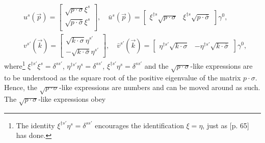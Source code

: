\begin{equation}
	\begin{split}
		&u^s(\vec{p})=\begin{bmatrix}
			\sqrt{p\cdot \sigma}\xi^s\\
			\sqrt{p\cdot \bar{\sigma}}\xi^s\\
		\end{bmatrix}, \quad \bar{u}^s(\vec{p})=\begin{bmatrix}
			\xi^{\dagger s}\sqrt{p\cdot \sigma} & \xi^{\dagger s}\sqrt{p\cdot \bar{\sigma}}
		\end{bmatrix}\gamma^0, \\
		&v^{s'}(\vec{k})=\begin{bmatrix}
			\sqrt{k\cdot \sigma} \eta^{s'}\\
			-\sqrt{k\cdot \bar{\sigma}}\eta^{s'}
		\end{bmatrix}, \quad \bar{v}^{s'}(\vec{k})=\begin{bmatrix}
			\eta^{\dagger s'}\sqrt{k\cdot \sigma} & -\eta^{\dagger s'}\sqrt{k\cdot \bar{\sigma}}
		\end{bmatrix}\gamma^0,
	\end{split}
\end{equation} 
where\footnote{The identity $\xi^{\dagger s'}\eta^{s}=\delta^{ss'}$ encourages the identification $\xi=\eta$, just as \citet{Peskin1995}[p. 65] has done.} $\xi^{\dagger s'}\xi^s=\delta^{ss'}$, $\eta^{\dagger s'}\eta^s=\delta^{ss'}$, $\xi^{\dagger s'}\eta^{s}=\delta^{ss'}$ and the $\sqrt{p\cdot \sigma}$-like expressions are to be understood as the square root of the positive eigenvalue of the matrix $p\cdot \sigma$. Hence, the $\sqrt{p\cdot \sigma}$-like expressions are numbers and can be moved around as such. The $\sqrt{p\cdot \sigma}$-like expressions obey

